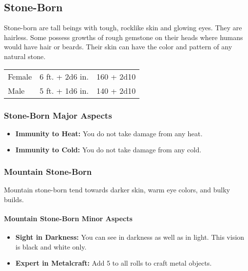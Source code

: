 \begin{multicols}{2}
\subsection{Stone-Born}

Stone-born are tall beings with tough, rocklike skin and glowing eyes. They are hairless. Some
possess growths of rough gemstone on their heads where humans would have hair or beards. Their
skin can have the color and pattern of any natural stone.

\begin{center}
{
\begin{xtabular}{|l|l|l|}
Female & 6 ft. + 2d6 in. & 160 + 2d10 \\
Male & 5 ft. + 1d6 in. & 140 + 2d10 \\
\hline
\end{xtabular}
}
\end{center}

\subsubsection{Stone-Born Major Aspects}

\begin{itemize}
    \item \textbf{Immunity to Heat:} You do not take damage from any heat.
    \item \textbf{Immunity to Cold:} You do not take damage from any cold.
\end{itemize}

\subsubsection{Mountain Stone-Born}

Mountain stone-born tend towards darker skin, warm eye colors, and bulky builds.

\paragraph{Mountain Stone-Born Minor Aspects}

\begin{itemize}
    \item \textbf{Sight in Darkness:} You can see in darkness as well as in light. This vision is black and white only.
    \item \textbf{Expert in Metalcraft:} Add 5 to all rolls to craft metal objects.
\end{itemize}


\end{multicols}
